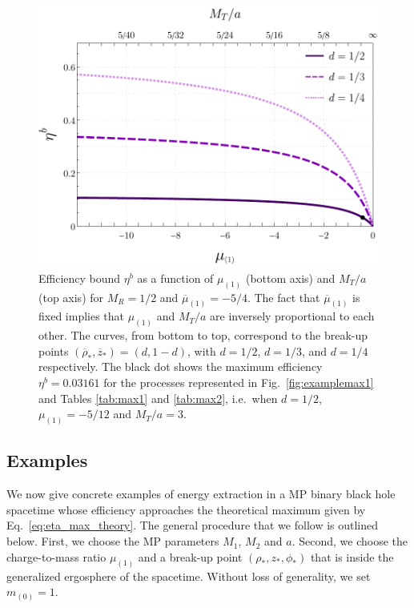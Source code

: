 \begin{figure}[!htbp]
    \centering
    \includegraphics[scale=0.70]{img/penrose_binaries/fig10.pdf}
    \caption{Efficiency bound $\eta ^ b$ as a function of $\mu_{(1)}$ (bottom axis) and $M_T/a$ (top axis) for $M_R=1/2$ and $\overline \mu _{(1)} = -5/4$. The fact that $\overline \mu _{(1)}$ is fixed implies that $\mu_{(1)}$ and $M_T/a$ are inversely proportional to each other. The curves, from bottom to top, correspond to the break-up points $(\overline \rho_*, \overline z_*)=(d,1-d)$, with $d=1/2$, $d=1/3$, and $d=1/4$ respectively. The black dot shows the maximum efficiency $\eta^b = 0.03161$ for the processes represented in Fig.~\ref{fig:examplemax1} and Tables \ref{tab:max1} and \ref{tab:max2}, i.e.~when $d=1/2$, $\mu_{(1)} = - 5/12$ and $M_T/a=3$.}
    \label{fig:efficiency1}
\end{figure}




\subsection{Examples}

We now give concrete examples of energy extraction in a MP binary black hole spacetime whose efficiency approaches the theoretical maximum given by Eq.~\eqref{eq:eta_max_theory}. The general procedure that we follow is outlined below. First, we choose the MP parameters $M_1$, $M_2$ and $a$. Second, we choose the charge-to-mass ratio $\mu_{(1)}$ and a break-up point $(\rho_*,z_*,\phi_*)$ that is inside the generalized ergosphere of the spacetime. Without loss of generality, we set $m_{(0)}=1$.


